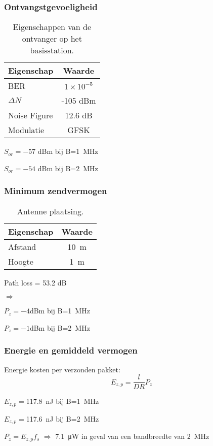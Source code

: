 \begin{frame}
    \frametitle{Ontvangstgevoeligheid}

    \begin{table}
        \centering
        \begin{tabular}{l|c}
            Eigenschap & Waarde \\\hline
            BER & $1\times10^{-5}$ \\
            $\Delta N$ & -105 dBm \\
            Noise Figure & 12.6 dB \\
            Modulatie & GFSK \\
        \end{tabular}
        \caption{Eigenschappen van de ontvanger op het basisstation.}
    \end{table}

    \pause 

    $S_{or}=-57$ dBm bij B=\qty{1}{\mega\hertz}

    $S_{or}=-54$ dBm bij B=\qty{2}{\mega\hertz}

\end{frame}

\begin{frame}
    \frametitle{Minimum zendvermogen}

    \begin{table}
        \centering
        \begin{tabular}{l|c}
            Eigenschap & Waarde \\\hline
            Afstand & \qty{10}{\meter} \\
            Hoogte & \qty{1}{\meter} \\
        \end{tabular}
        \caption{Antenne plaatsing.}
    \end{table}

    Path loss = 53.2 dB

    \pause

    $\Rightarrow$

    $P_{z}=-4$dBm bij B=\qty{1}{\mega\hertz}

    $P_{z}=-1$dBm bij B=\qty{2}{\mega\hertz}
\end{frame}

\begin{frame}
    \frametitle{Energie en gemiddeld vermogen}

    Energie kosten per verzonden pakket:
    \begin{equation*}
        E_{z,p}=\frac{l}{DR}P_z
    \end{equation*}

    \pause

    $E_{z,p}=$\qty{117.8}{\nano\joule} bij B=\qty{1}{\mega\hertz}

    $E_{z,p}=$\qty{117.6}{\nano\joule} bij B=\qty{2}{\mega\hertz}

    \pause

    \vspace{1cm}
    $\overline{P_z}=E_{z,p}f_s$ $\Rightarrow$ \qty{7.1}{\micro\watt} in geval van een bandbreedte van \qty{2}{\mega\hertz}

\end{frame}